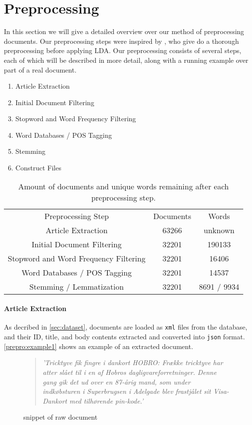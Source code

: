 \section{Preprocessing}\label{sec:prepro}

In this section we will give a detailed overview over our method of preprocessing documents.
Our preprocessing steps were inspired by \cite{quanti}, who give do a thorough  preprocessing before applying LDA. 
Our preprocessing consists of several steps, each of which will be described in more detail, along with a running example over part of a real document.
\begin{enumerate}[label=\alph*]
	\item Article Extraction
	\item Initial Document Filtering
	\item Stopword and Word Frequency Filtering
	\item Word Databases / POS Tagging
	\item Stemming
	\item Construct Files
\end{enumerate}

\begin{table}
	\begin{tabular}{c|c|c}
		Preprocessing Step & Documents & Words\\
		Article Extraction & 63266 & unknown \\ 
		Initial Document Filtering & 32201 & 190133 \\ 
		Stopword and Word Frequency Filtering & 32201 & 16406 \\
		Word Databases / POS Tagging & 32201 & 14537 \\
		Stemming / Lemmatization & 32201 & 8691 / 9934\\
	\end{tabular}
	\label{tab:prepro_doc_word}
	\caption{Amount of documents and unique words remaining after each preprocessing step.}
\end{table}

\paragraph{Article Extraction}
As decribed in \autoref{sec:dataset}, documents are loaded as \texttt{xml} files from the database, and their ID, title, and body contents extracted and converted into \texttt{json} format. \autoref{prepro:example1} shows an example of an extracted document.
\begin{figure}[h]
	\begin{quote}
		\textit{
			'Tricktyve fik fingre i dankort HOBRO: Frække tricktyve har atter slået til i en af Hobros dagligvareforretninger. Denne gang gik det ud over en 87-årig mand, som under indkøbsturen i Superbrugsen i Adelgade blev frastjålet sit Visa-Dankort med tilhørende pin-kode.'
		}
	\end{quote}
	\caption{snippet of raw document}
	\label{prepro:example1}
\end{figure}

